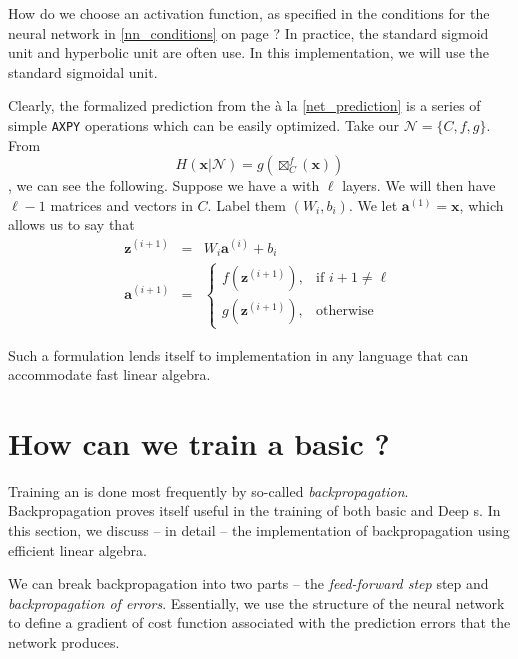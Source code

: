 How do we choose an activation function, as specified in the conditions for the neural network in \ref{nn_conditions} on page \pageref{nn_conditions}? In practice, the standard sigmoid unit and hyperbolic unit are often use. In this implementation, we will use the standard sigmoidal unit.

Clearly, the formalized prediction from the \nn{} \`{a} la \eqref{net_prediction} is a series of simple \texttt{AXPY} operations which can be easily optimized. Take our \nn{} $\mathcal{N}=\{ C, f, g \}$. From $$H(\mathbf{x} | \mathcal{N}) = g(\boxtimes_{C}^{f}(\mathbf{x}))$$, we can see the following. Suppose we have a \nn{} with $\ell$ layers. We will then have $\ell-1$ matrices and vectors in $C$. Label them $(W_i, b_i)$. We let $\mathbf{a}^{(1)} = \mathbf{x}$,  which allows us to say that 
\begin{eqnarray}
\label{feedforward}
\mathbf{z}^{(i+1)} &=& W_i \mathbf{a}^{(i)} + b_i\\
\mathbf{a}^{(i+1)} &=& 
	\begin{cases} 
		f(\mathbf{z}^{(i+1)}), & \mbox{if } i+1 \neq \ell \\ 
		g(\mathbf{z}^{(i+1)}), & \mbox{otherwise}
	\end{cases}
\end{eqnarray}

Such a formulation lends itself to implementation in any language that can accommodate fast linear algebra.

\section{How can we train a basic \ann{}?}
\label{basix}

Training an \ann{} is done most frequently by so-called \emph{backpropagation}. Backpropagation proves itself useful in the training of both basic and Deep \nn{}s. In this section, we discuss -- in detail -- the implementation of backpropagation using efficient linear algebra.

We can break backpropagation into two parts --  the \emph{feed-forward step} step and \emph{backpropagation of errors}. Essentially, we use the structure of the neural network to define a gradient of cost function associated with the prediction errors that the network produces. 

